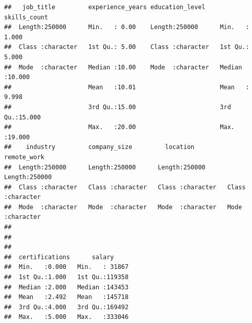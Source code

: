 \documentclass[
]{article}
\begin{document}
\begin{verbatim}
##   job_title         experience_years education_level     skills_count   
##  Length:250000      Min.   : 0.00    Length:250000      Min.   : 1.000  
##  Class :character   1st Qu.: 5.00    Class :character   1st Qu.: 5.000  
##  Mode  :character   Median :10.00    Mode  :character   Median :10.000  
##                     Mean   :10.01                       Mean   : 9.998  
##                     3rd Qu.:15.00                       3rd Qu.:15.000  
##                     Max.   :20.00                       Max.   :19.000  
##    industry         company_size         location         remote_work       
##  Length:250000      Length:250000      Length:250000      Length:250000     
##  Class :character   Class :character   Class :character   Class :character  
##  Mode  :character   Mode  :character   Mode  :character   Mode  :character  
##                                                                             
##                                                                             
##                                                                             
##  certifications      salary      
##  Min.   :0.000   Min.   : 31867  
##  1st Qu.:1.000   1st Qu.:119358  
##  Median :2.000   Median :143453  
##  Mean   :2.492   Mean   :145718  
##  3rd Qu.:4.000   3rd Qu.:169492  
##  Max.   :5.000   Max.   :333046
\end{verbatim}
\end{document}
